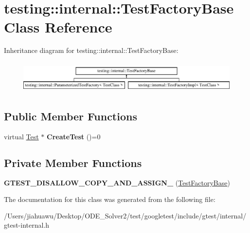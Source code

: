 \hypertarget{classtesting_1_1internal_1_1_test_factory_base}{}\section{testing\+:\+:internal\+:\+:Test\+Factory\+Base Class Reference}
\label{classtesting_1_1internal_1_1_test_factory_base}
Inheritance diagram for testing\+:\+:internal\+:\+:Test\+Factory\+Base\+:\begin{figure}[H]
\begin{center}
\leavevmode
\includegraphics[height=1.666667cm]{classtesting_1_1internal_1_1_test_factory_base}
\end{center}
\end{figure}
\subsection*{Public Member Functions}
\begin{DoxyCompactItemize}
\item 
\mbox{\label{classtesting_1_1internal_1_1_test_factory_base_a07ac3ca0b196cdb092da0bb186b7c030}} 
virtual \mbox{\hyperlink{classtesting_1_1_test}{Test}} $\ast$ {\bfseries Create\+Test} ()=0
\end{DoxyCompactItemize}
\subsection*{Private Member Functions}
\begin{DoxyCompactItemize}
\item 
\mbox{\label{classtesting_1_1internal_1_1_test_factory_base_a85d7cb90e00f165e61a008be77293fb4}} 
{\bfseries G\+T\+E\+S\+T\+\_\+\+D\+I\+S\+A\+L\+L\+O\+W\+\_\+\+C\+O\+P\+Y\+\_\+\+A\+N\+D\+\_\+\+A\+S\+S\+I\+G\+N\+\_\+} (\mbox{\hyperlink{classtesting_1_1internal_1_1_test_factory_base}{Test\+Factory\+Base}})
\end{DoxyCompactItemize}


The documentation for this class was generated from the following file\+:\begin{DoxyCompactItemize}
\item 
/\+Users/jiahuawu/\+Desktop/\+O\+D\+E\+\_\+\+Solver2/test/googletest/include/gtest/internal/gtest-\/internal.\+h\end{DoxyCompactItemize}
